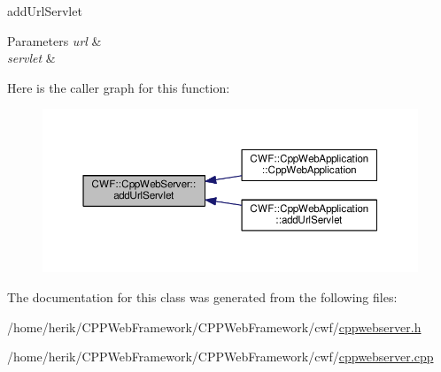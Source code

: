 add\+Url\+Servlet 


\begin{DoxyParams}{Parameters}
{\em url} & \\
\hline
{\em servlet} & \\
\hline
\end{DoxyParams}


Here is the caller graph for this function\+:
\nopagebreak
\begin{figure}[H]
\begin{center}
\leavevmode
\includegraphics[width=350pt]{class_c_w_f_1_1_cpp_web_server_a8acbe56b5d63ded67879f4ed31170c2e_icgraph}
\end{center}
\end{figure}




The documentation for this class was generated from the following files\+:\begin{DoxyCompactItemize}
\item 
/home/herik/\+C\+P\+P\+Web\+Framework/\+C\+P\+P\+Web\+Framework/cwf/\hyperlink{cppwebserver_8h}{cppwebserver.\+h}\item 
/home/herik/\+C\+P\+P\+Web\+Framework/\+C\+P\+P\+Web\+Framework/cwf/\hyperlink{cppwebserver_8cpp}{cppwebserver.\+cpp}\end{DoxyCompactItemize}
